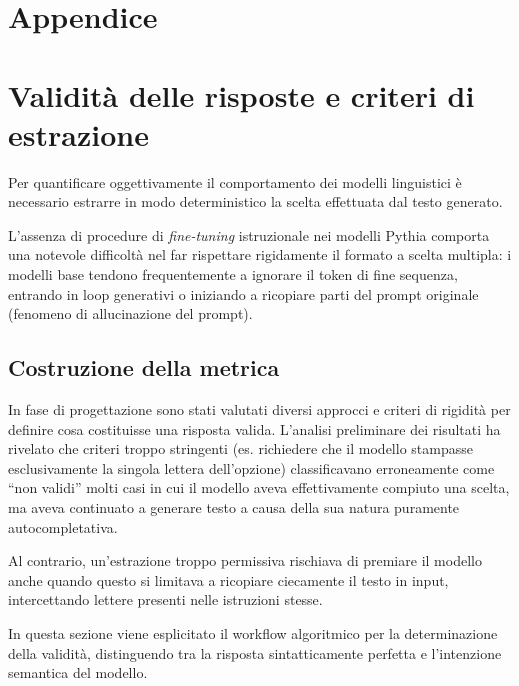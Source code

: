 \documentclass[../relazione.tex]{subfiles}
\begin{document}
\section*{Appendice}

\section{Validità delle risposte e criteri di estrazione}
\label{app:validity}
Per quantificare oggettivamente il comportamento dei modelli linguistici è necessario estrarre in modo deterministico la scelta effettuata dal testo generato. 

L'assenza di procedure di \textit{fine-tuning} istruzionale nei modelli Pythia comporta una notevole difficoltà nel far rispettare rigidamente il formato a scelta multipla: i modelli base tendono frequentemente a ignorare il token di fine sequenza, entrando in loop generativi o iniziando a ricopiare parti del prompt originale (fenomeno di allucinazione del prompt).

\subsection{Costruzione della metrica}
In fase di progettazione sono stati valutati diversi approcci e criteri di rigidità per definire cosa costituisse una risposta valida. L'analisi preliminare dei risultati ha rivelato che criteri troppo stringenti (es. richiedere che il modello stampasse esclusivamente la singola lettera dell'opzione) classificavano erroneamente come ``non validi'' molti casi in cui il modello aveva effettivamente compiuto una scelta, ma aveva continuato a generare testo a causa della sua natura puramente autocompletativa.

Al contrario, un'estrazione troppo permissiva rischiava di premiare il modello anche quando questo si limitava a ricopiare ciecamente il testo in input, intercettando lettere presenti nelle istruzioni stesse. 

In questa sezione viene esplicitato il workflow algoritmico per la determinazione della validità, distinguendo tra la risposta sintatticamente perfetta e l'intenzione semantica del modello.
\end{document}
